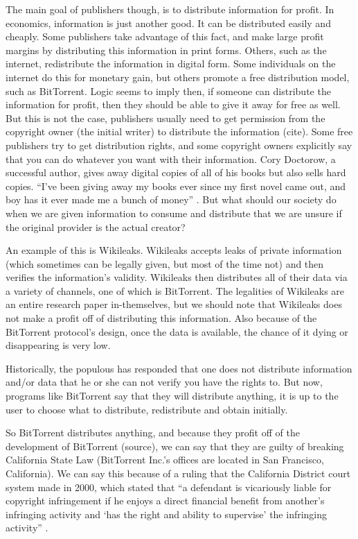 \documentclass[11pt]{article}
\begin{document}
The main goal of publishers though, is to distribute information for profit. In economics, information is just another good. It can be distributed easily and cheaply. Some publishers take advantage of this fact, and make large profit margins\cite{PSO} by distributing this information in print forms. Others, such as the internet, redistribute the information in digital form. Some individuals on the internet do this for monetary gain, but others promote a free distribution model, such as BitTorrent. Logic seems to imply then, if someone can distribute the information for profit, then they should be able to give it away for free as well. But this is not the case, publishers usually need to get permission from the copyright owner (the initial writer) to distribute the information (cite). Some free publishers try to get distribution rights, and some copyright owners explicitly say that you can do whatever you want with their information. Cory Doctorow, a successful author, gives away digital copies of all of his books but also sells hard copies. ``I've been giving away my books ever since my first novel came out, and boy has it ever made me a bunch of money'' \cite{doctorow}. But what should our society do when we are given information to consume and distribute that we are unsure if the original provider is the actual creator?

An example of this is Wikileaks. Wikileaks accepts leaks of private information (which sometimes can be legally given, but most of the time not) and then verifies the information's validity. Wikileaks then distributes all of their data via a variety of channels, one of which is BitTorrent. The legalities of Wikileaks are an entire research paper in-themselves, but we should note that Wikileaks does not make a profit off of distributing this information. Also because of the BitTorrent protocol's design, once the data is available, the chance of it dying or disappearing is very low.

Historically, the populous has responded that one does not distribute information and/or data that he or she can not verify you have the rights to. But now, programs like BitTorrent say that they will distribute anything, it is up to the user to choose what to distribute, redistribute and obtain initially.

So BitTorrent distributes anything, and because they profit off of the development of BitTorrent (source), we can say that they are guilty of breaking California State Law (BitTorrent Inc.'s offices are located in San Francisco, California). We can say this because of a ruling that the California District court system made in 2000, which stated that ``a defendant is vicariously liable for copyright infringement if he enjoys a direct financial benefit from another's infringing activity and `has the right and ability to supervise' the infringing activity'' \cite{2000m}.
\end{document}
